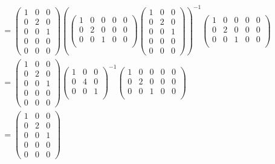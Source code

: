 \documentclass[12pt]{article}
\begin{document}
\begin{gather*}= 
\left( \begin{array}{rrr}
1 &0&0\\
0      &2&0\\
0&0&1\\
0&0&0\\
0&0&0
\end{array} \right)
\left(
\left( \begin{array}{rrrrr}
1 &0&0&0&0\\
0      &2&0&0&0\\
0&0&1&0&0\\
\end{array} \right)
\left( \begin{array}{rrr}
1 &0&0\\
0      &2&0\\
0&0&1\\
0&0&0\\
0&0&0
\end{array} \right)
\right)^{-1}
\left( \begin{array}{rrrrr}
1 &0&0&0&0\\
0      &2&0&0&0\\
0&0&1&0&0\\
\end{array} \right)
\\= 
\left( \begin{array}{rrr}
1 &0&0\\
0      &2&0\\
0&0&1\\
0&0&0\\
0&0&0
\end{array} \right)
\left( \begin{array}{rrr}
1 &0&0\\
0      &4&0\\
0&0&1\\
\end{array} \right)^{-1}
\left( \begin{array}{rrrrr}
1 &0&0&0&0\\
0      &2&0&0&0\\
0&0&1&0&0\\
\end{array} \right)
\\= 
\left( \begin{array}{rrr}
1 &0&0\\
0      &2&0\\
0&0&1\\
0&0&0\\
0&0&0
\end{array} \right)

\end{gather*}
\end{document}
